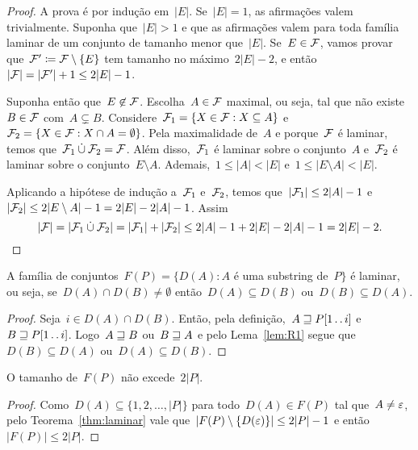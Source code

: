 \begin{proof}
A prova é por indução em~$|E|$. Se~$|E| = 1$, as afirmações valem trivialmente. Suponha que~$|E| > 1$ e que as afirmações valem para toda família laminar de um conjunto de tamanho menor que~$|E|$. Se~$E \in \mathcal{F}$, vamos provar que~$\mathcal{F}' \coloneqq \mathcal{F} \setminus \{E\}$ tem tamanho no máximo~$2|E| - 2$, e então~$|\mathcal{F}| = |\mathcal{F}'| + 1 \leq 2|E| - 1$.

Suponha então que~$E \not\in \mathcal{F}$. Escolha~$A \in \mathcal{F}$ maximal, ou seja, tal que não existe~$B \in \mathcal{F}$ com~$A \subsetneq B$. Considere~$\mathcal{F}_1 = \{X \in \mathcal{F} : X \subseteq A\}$ e~$\mathcal{F}_2 = \{X \in \mathcal{F} : X \cap A = \emptyset\}$. Pela maximalidade de~$A$ e porque~$\mathcal{F}$ é laminar, temos que~$\mathcal{F}_1 \mathbin{\dot{\cup}} \mathcal{F}_2 = \mathcal{F}$. Além disso,~$\mathcal{F}_1$ é laminar sobre o conjunto~$A$ e~$\mathcal{F}_2$ é laminar sobre o conjunto~$E \setminus A$. Ademais,~${1 \leq |A| < |E|}$ e~${1 \leq |E \setminus A| < |E|}$.

Aplicando a hipótese de indução a~$\mathcal{F}_1$ e~$\mathcal{F}_2$, temos que~$|\mathcal{F}_1| \leq 2|A| - 1$ e~${|\mathcal{F}_2| \leq 2|E \setminus A| - 1 = 2|E| - 2|A| - 1}$. Assim~$$|\mathcal{F}| = |\mathcal{F}_1 \mathbin{\dot{\cup}} \mathcal{F}_2| = |\mathcal{F}_1| + |\mathcal{F}_2| \leq 2|A| - 1 + 2|E| - 2|A| - 1 = 2|E| - 2.$$
\end{proof}

\begin{prop}
\label{thm:R3}
A família de conjuntos~$F(P) = \{D(A) : A$ é uma substring de~$P\}$ é laminar, ou seja, se~$D(A) \cap D(B) \neq \emptyset$ então~$D(A) \subseteq D(B)$ ou~$D(B) \subseteq D(A)$.
\end{prop}

\begin{proof}
Seja~$i \in D(A) \cap D(B)$. Então, pela definição,~${A \sqsupseteq P[1\,.\,.\, i]}$ e~${B \sqsupseteq P[1\,.\,.\, i]}$. Logo~${A \sqsupseteq B}$ ou~${B \sqsupseteq A}$ e pelo Lema~\ref{lem:R1} segue que~$D(B) \subseteq D(A)$ ou~$D(A) \subseteq D(B)$.
\end{proof}

\begin{corollary} \label{col:oclin}
O tamanho de~$F(P)$ não excede~$2|P|$.
\end{corollary}

\begin{proof}
Como~$D(A) \subseteq \{1, 2, \ldots, |P|\}$ para todo~$D(A) \in F(P)$ tal que~$A \neq \varepsilon$,  pelo Teorema~\ref{thm:laminar} vale que~$|F(P) \setminus \{D(\varepsilon)\}| \leq 2|P| - 1$ e então~${|F(P)| \leq 2|P|}$.
\end{proof}

